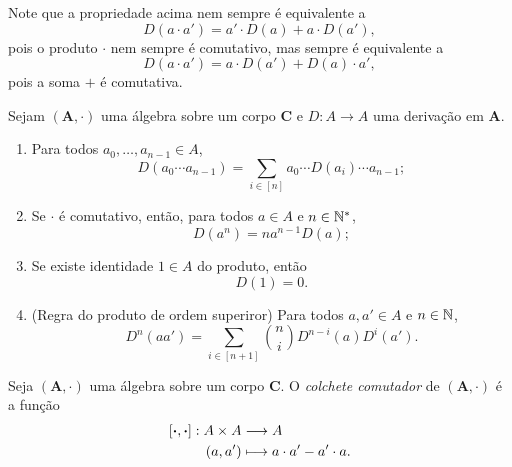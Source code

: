 Note que a propriedade acima nem sempre é equivalente a
	\begin{equation*}
	D(a \cdot a') = a' \cdot D(a)  + a \cdot D(a'),
	\end{equation*}
pois o produto $\cdot$ nem sempre é comutativo, mas sempre é equivalente a
	\begin{equation*}
	D(a \cdot a') = a \cdot D(a') + D(a) \cdot a',
	\end{equation*}
pois a soma $+$ é comutativa.

\begin{prop}
Sejam $(\bm A,\cdot)$ uma álgebra sobre um corpo $\bm C$ e $D\colon A \to A$ uma derivação em $\bm A$.
	\begin{enumerate}
	\item Para todos $a_0,\ldots,a_{n-1} \in A$,
		\begin{equation*}
		D(a_0 \cdots a_{n-1}) = \sum_{i \in [n]} a_0 \cdots D(a_i) \cdots a_{n-1};
		\end{equation*}
	\item Se $\cdot$ é comutativo, então, para todos $a \in A$ e $n \in \mathbb{N}^*$,
		\begin{equation*}
		D(a^n) = na^{n-1}D(a);
		\end{equation*}
	\item Se existe identidade $1 \in A$ do produto, então
		\begin{equation*}
		D(1)=0.
		\end{equation*}
	\item (Regra do produto de ordem superiror) Para todos $a,a' \in A$ e $n \in \mathbb{N}$,
		\begin{equation*}
		D^n(aa') = \sum_{i \in [n+1]} \binom{n}{i} D^{n-i}(a)D^i(a').
		\end{equation*}
	\end{enumerate}
\end{prop}

\begin{defi}
Seja $(\bm A,\cdot)$ uma álgebra sobre um corpo $\bm C$. O \emph{colchete comutador} de $(\bm A,\cdot)$ é a função
	\begin{align*}
	{[\bm{\cdot},\bm{\cdot}]}: {A \times A} &\longrightarrow {A} \\{(a,a')} &\longmapsto {a \cdot a' - a' \cdot a.}
	\end{align*}
\end{defi}

